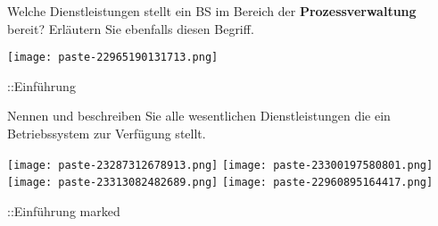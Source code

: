 \documentclass{article}
\begin{document}
\begin{tcolorbox}[colback=white!10!white,colframe=lightgray!75!black,
  savelowerto=\jobname_ex.tex]

\begin{center}
Welche Dienstleistungen stellt ein BS im Bereich der 
\textbf{Prozessverwaltung
}bereit? Erläutern Sie ebenfalls diesen Begriff.

\end{center}

\tcblower

\justifying
\texttt{[image: paste-22965190131713.png]}

\end{tcolorbox}
\begin{tcolorbox}[colback=white!10!white,colframe=lightgray!75!black,
  savelowerto=\jobname_ex.tex]

\begin{center}
::Einführung

\end{center}

\tcblower

\justifying

\end{tcolorbox}
\begin{tcolorbox}[colback=white!10!white,colframe=lightgray!75!black,
  savelowerto=\jobname_ex.tex]

\begin{center}
Nennen und beschreiben Sie alle wesentlichen Dienstleistungen die ein Betriebssystem zur Verfügung stellt.

\end{center}

\tcblower

\justifying
\texttt{[image: paste-23287312678913.png]}
\texttt{[image: paste-23300197580801.png]}
\texttt{[image: paste-23313082482689.png]}
\texttt{[image: paste-22960895164417.png]}

\end{tcolorbox}
\begin{tcolorbox}[colback=white!10!white,colframe=lightgray!75!black,
  savelowerto=\jobname_ex.tex]

\begin{center}
::Einführung marked

\end{center}

\tcblower

\justifying

\end{tcolorbox}
\end{document}
